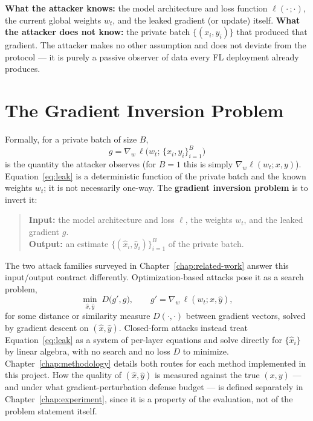 \textbf{What the attacker knows:} the model architecture and loss function
$\ell(\cdot\,;\cdot)$, the current global weights $w_t$, and the leaked
gradient (or update) itself. \textbf{What the attacker does not know:} the
private batch $\{(x_i, y_i)\}$ that produced that gradient. The attacker
makes no other assumption and does not deviate from the protocol --- it is
purely a passive observer of data every FL deployment already produces.

\section{The Gradient Inversion Problem}
\label{sec:gi-problem}

Formally, for a private batch of size $B$,
\begin{equation}
g = \nabla_w \, \ell\big(w_t;\, \{x_i, y_i\}_{i=1}^{B}\big)
\label{eq:leak}
\end{equation}
is the quantity the attacker observes (for $B=1$ this is simply
$\nabla_w \ell(w_t; x, y)$). Equation~\eqref{eq:leak} is a deterministic
function of the private batch and the known weights $w_t$; it is not
necessarily one-way. The \textbf{gradient inversion problem} is to invert
it:

\begin{quote}
\textbf{Input:} the model architecture and loss $\ell$, the weights $w_t$,
and the leaked gradient $g$. \\
\textbf{Output:} an estimate $\{(\hat{x}_i, \hat{y}_i)\}_{i=1}^{B}$ of the
private batch.
\end{quote}

The two attack families surveyed in Chapter~\ref{chap:related-work} answer
this input/output contract differently. Optimization-based attacks pose it
as a search problem,
\begin{equation}
\min_{\hat{x}, \hat{y}} \; D\big(g', g\big), \qquad g' = \nabla_w \, \ell(w_t; \hat{x}, \hat{y}),
\label{eq:opt-attack}
\end{equation}
for some distance or similarity measure $D(\cdot,\cdot)$ between gradient
vectors, solved by gradient descent on $(\hat{x}, \hat{y})$. Closed-form
attacks instead treat Equation~\eqref{eq:leak} as a system of per-layer
equations and solve directly for $\{\hat{x}_i\}$ by linear algebra, with no
search and no loss $D$ to minimize. Chapter~\ref{chap:methodology} details
both routes for each method implemented in this project. How the quality
of $(\hat{x}, \hat{y})$ is measured against the true $(x, y)$ --- and under
what gradient-perturbation defense budget --- is defined separately in
Chapter~\ref{chap:experiment}, since it is a property of the evaluation, not of the problem
statement itself.
